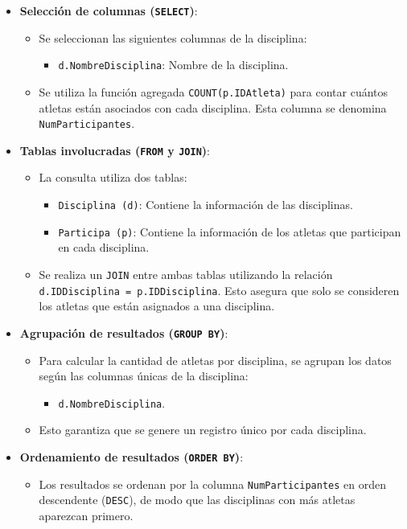 \begin{itemize}
   \item \textbf{Selección de columnas (\texttt{SELECT})}:
   \begin{itemize}
       \item Se seleccionan las siguientes columnas de la disciplina:
       \begin{itemize}
           \item \texttt{d.NombreDisciplina}: Nombre de la disciplina.
       \end{itemize}
       \item Se utiliza la función agregada \texttt{COUNT(p.IDAtleta)} para contar cuántos atletas están asociados con cada disciplina. Esta columna se denomina \texttt{NumParticipantes}.
   \end{itemize}
   
   \item \textbf{Tablas involucradas (\texttt{FROM} y \texttt{JOIN})}:
   \begin{itemize}
       \item La consulta utiliza dos tablas:
       \begin{itemize}
           \item \texttt{Disciplina (d)}: Contiene la información de las disciplinas.
           \item \texttt{Participa (p)}: Contiene la información de los atletas que participan en cada disciplina.
       \end{itemize}
       \item Se realiza un \texttt{JOIN} entre ambas tablas utilizando la relación \texttt{d.IDDisciplina = p.IDDisciplina}. Esto asegura que solo se consideren los atletas que están asignados a una disciplina.
   \end{itemize}
   
   \item \textbf{Agrupación de resultados (\texttt{GROUP BY})}:
   \begin{itemize}
       \item Para calcular la cantidad de atletas por disciplina, se agrupan los datos según las columnas únicas de la disciplina:
       \begin{itemize}
           \item \texttt{d.NombreDisciplina}.
       \end{itemize}
       \item Esto garantiza que se genere un registro único por cada disciplina.
   \end{itemize}
   
   \item \textbf{Ordenamiento de resultados (\texttt{ORDER BY})}:
   \begin{itemize}
       \item Los resultados se ordenan por la columna \texttt{NumParticipantes} en orden descendente (\texttt{DESC}), de modo que las disciplinas con más atletas aparezcan primero.
   \end{itemize}
\end{itemize}

